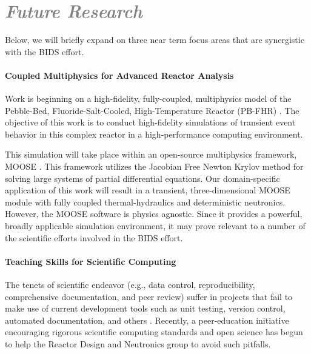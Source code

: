 \documentclass[a4paper, 12pt]{article}
\begin{document}
\section*{\textcolor{gray}{\it Future Research}}

Below, we will briefly expand on three near term 
focus areas that are synergistic with the BIDS effort.  

\paragraph{Coupled Multiphysics for Advanced Reactor Analysis}

Work is beginning on a high-fidelity, fully-coupled, multiphysics model of the 
Pebble-Bed, Fluoride-Salt-Cooled, High-Temperature Reactor (PB-FHR) 
\cite{facilitators_fluoride-salt-cooled_2013, 
facilitators_fluoride-salt-cooled_2013-1, 
facilitators_fluoride-salt-cooled_2013-2, 
facilitators_fluoride-salt-cooled_2013-3}. The objective of this work is to 
conduct high-fidelity simulations of transient event behavior in this complex 
reactor in a high-performance computing environment.

This simulation will take place within an open-source 
multiphysics framework, MOOSE \cite{gaston_moose:_2009}. 
This framework utilizes the Jacobian Free 
Newton Krylov method for solving large systems of partial differential 
equations. 
Our domain-specific application of this work will result in a transient, 
three-dimensional MOOSE module with fully coupled thermal-hydraulics and 
deterministic neutronics. However, the MOOSE software is physics agnostic. Since 
it provides a powerful, broadly applicable simulation environment, it may prove 
relevant to a number of the scientific efforts involved in the BIDS effort. 


\paragraph{Teaching Skills for Scientific Computing}
The tenets of scientific endeavor (e.g., data control, 
reproducibility, comprehensive documentation, and peer review) suffer in 
projects that fail to make use of current development tools such as unit 
testing, version control, automated documentation, and others 
\cite{wilson_best_2014, merali_computational_2010}.  Recently, a peer-education 
initiative \cite{huff_hacker_2014} encouraging rigorous 
scientific computing standards and open science has begun to help the Reactor 
Design and Neutronics group to avoid such pitfalls.
\end{document}

